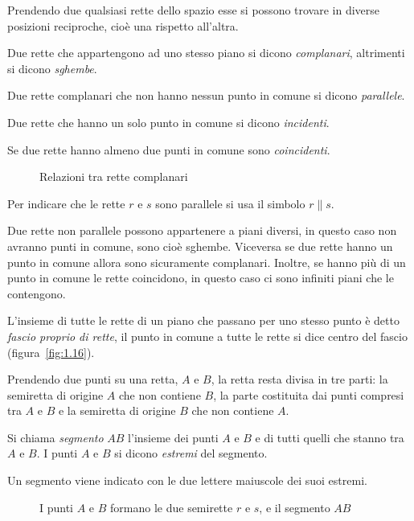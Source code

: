 Prendendo due qualsiasi rette dello spazio esse si possono trovare in diverse posizioni reciproche, cioè una rispetto all'altra.
\begin{definizione}
Due rette che appartengono ad uno stesso piano si dicono \emph{complanari}, altrimenti si dicono \emph{sghembe}.
\end{definizione}

\begin{definizione}
Due rette complanari che non hanno nessun punto in comune si dicono \emph{parallele}.
\end{definizione}

\begin{definizione}
Due rette che hanno un solo punto in comune si dicono \emph{incidenti}.
\end{definizione}

\begin{definizione}
Se due rette hanno almeno due punti in comune sono \emph{coincidenti}.
\end{definizione}

\begin{figure}[hbt]
 \centering 
 \caption{Relazioni tra rette complanari}\label{fig:1.12}
\end{figure}
Per indicare che le rette $r$ e $s$ sono parallele si usa il simbolo $r \parallel s$.

\osservazione Due rette non parallele possono appartenere a piani diversi, in questo caso non avranno punti in comune, sono cioè sghembe. Viceversa se due rette hanno un punto in comune allora sono sicuramente complanari. Inoltre, se hanno più di un punto in comune le rette coincidono, in questo caso ci sono infiniti piani che le contengono. 

\begin{definizione}
L'insieme di tutte le rette di un piano che passano per uno stesso punto è detto \emph{fascio proprio di rette}, il punto in comune a tutte le rette si dice centro del fascio (figura~\ref{fig:1.16}).
\end{definizione}

Prendendo due punti su una retta, $A$ e $B$, la retta resta divisa in tre parti: la semiretta di origine $A$ che non contiene $B$, la parte costituita dai punti compresi tra $A$ e $B$ e la semiretta di origine $B$ che non contiene $A$.

\begin{definizione}
Si chiama \emph{segmento} $AB$ l'insieme dei punti $A$ e $B$ e di tutti quelli che stanno tra $A$ e $B$.
I punti $A$ e $B$ si dicono \emph{estremi} del segmento.
\end{definizione}
Un segmento viene indicato con le due lettere maiuscole dei suoi estremi.
\begin{figure}[bth]
 \centering 
 \caption{I punti $A$ e $B$ formano le due semirette $r$ e $s$, e il segmento $AB$}\label{fig:1.13}
\end{figure}


